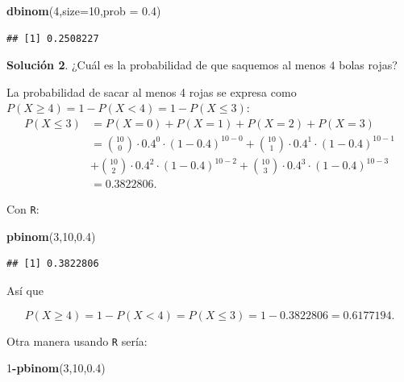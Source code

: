 \documentclass[]{book}
\newenvironment{Shaded}{\begin{snugshade}}{\end{snugshade}}
\newcommand{\DataTypeTok}[1]{\textcolor[rgb]{0.13,0.29,0.53}{#1}}
\newcommand{\DecValTok}[1]{\textcolor[rgb]{0.00,0.00,0.81}{#1}}
\newcommand{\FloatTok}[1]{\textcolor[rgb]{0.00,0.00,0.81}{#1}}
\newcommand{\KeywordTok}[1]{\textcolor[rgb]{0.13,0.29,0.53}{\textbf{#1}}}
\newcommand{\NormalTok}[1]{#1}
\newcommand{\OperatorTok}[1]{\textcolor[rgb]{0.81,0.36,0.00}{\textbf{#1}}}
\begin{document}
\begin{Shaded}
\begin{Highlighting}[]
\KeywordTok{dbinom}\NormalTok{(}\DecValTok{4}\NormalTok{,}\DataTypeTok{size=}\DecValTok{10}\NormalTok{,}\DataTypeTok{prob =} \FloatTok{0.4}\NormalTok{)}
\end{Highlighting}
\end{Shaded}

\begin{verbatim}
## [1] 0.2508227
\end{verbatim}

\textbf{Solución 2}. ¿Cuál es la probabilidad de que saquemos al menos \(4\) bolas rojas?

La probabilidad de sacar al menos 4 rojas se expresa como \(P(X \geq 4)=1-P(X<4)=1-P(X\leq 3):\)
\[
\begin{array}{rl}
P(X\leq 3)& = P(X=0)+P(X=1)+P(X=2)+P(X=3)\\
&= 
 {10\choose 0}\cdot 0.4^0\cdot (1-0.4)^{10-0}+ {10\choose 1}\cdot 0.4^1\cdot (1-0.4)^{10-1}\\
&+{10\choose 2}\cdot 0.4^2\cdot (1-0.4)^{10-2}+ {10\choose 3}\cdot 0.4^3\cdot (1-0.4)^{10-3}\\
&=0.3822806.
\end{array}
\]

Con \texttt{R}:

\begin{Shaded}
\begin{Highlighting}[]
\KeywordTok{pbinom}\NormalTok{(}\DecValTok{3}\NormalTok{,}\DecValTok{10}\NormalTok{,}\FloatTok{0.4}\NormalTok{)}
\end{Highlighting}
\end{Shaded}

\begin{verbatim}
## [1] 0.3822806
\end{verbatim}

Así que

\[P(X \geq 4 )=1-P(X< 4)=P(X\leq 3)=1-0.3822806=0.6177194.\]

Otra manera usando \texttt{R} sería:

\begin{Shaded}
\begin{Highlighting}[]
\DecValTok{1}\OperatorTok{-}\KeywordTok{pbinom}\NormalTok{(}\DecValTok{3}\NormalTok{,}\DecValTok{10}\NormalTok{,}\FloatTok{0.4}\NormalTok{)}
\end{Highlighting}
\end{Shaded}
\end{document}
